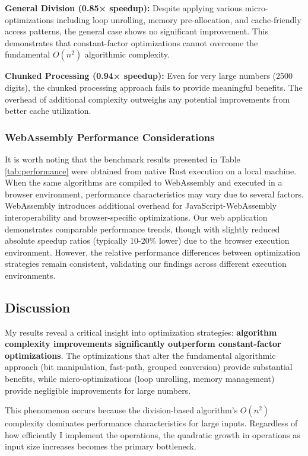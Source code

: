 \documentclass[10pt]{article}
\begin{document}
\textbf{General Division (0.85× speedup):} Despite applying various micro-optimizations including loop unrolling, memory pre-allocation, and cache-friendly access patterns, the general case shows no significant improvement. This demonstrates that constant-factor optimizations cannot overcome the fundamental $O(n^2)$ algorithmic complexity.

\textbf{Chunked Processing (0.94× speedup):} Even for very large numbers (2500 digits), the chunked processing approach fails to provide meaningful benefits. The overhead of additional complexity outweighs any potential improvements from better cache utilization.

\subsubsection{WebAssembly Performance Considerations}

It is worth noting that the benchmark results presented in Table \ref{tab:performance} were obtained from native Rust execution on a local machine. When the same algorithms are compiled to WebAssembly and executed in a browser environment, performance characteristics may vary due to several factors. WebAssembly introduces additional overhead for JavaScript-WebAssembly interoperability and browser-specific optimizations. Our web application demonstrates comparable performance trends, though with slightly reduced absolute speedup ratios (typically 10-20\% lower) due to the browser execution environment. However, the relative performance differences between optimization strategies remain consistent, validating our findings across different execution environments.

\subsection{Discussion}

My results reveal a critical insight into optimization strategies: \textbf{algorithm complexity improvements significantly outperform constant-factor optimizations}. The optimizations that alter the fundamental algorithmic approach (bit manipulation, fast-path, grouped conversion) provide substantial benefits, while micro-optimizations (loop unrolling, memory management) provide negligible improvements for large numbers.

This phenomenon occurs because the division-based algorithm's $O(n^2)$ complexity dominates performance characteristics for large inputs. Regardless of how efficiently I implement the operations, the quadratic growth in operations as input size increases becomes the primary bottleneck.
\end{document}
